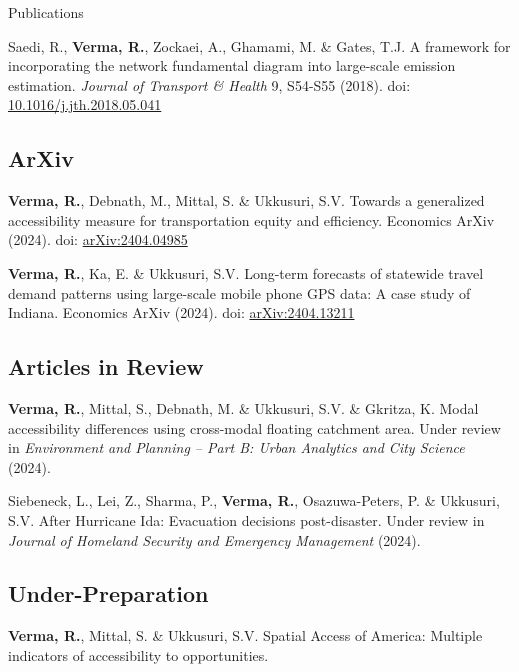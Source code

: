 \documentclass{CV} %
\begin{document}
\begin{rSection}{Publications}
\begin{etaremune}
        \item Saedi, R., \textbf{Verma, R.}, Zockaei, A., Ghamami, M. \& Gates, T.J. A framework for incorporating the network fundamental diagram into large-scale emission estimation. \textit{Journal of Transport \& Health} 9, S54-S55 (2018). doi: \href{https://www.sciencedirect.com/science/article/abs/pii/S2214140518302263}{10.1016/j.jth.2018.05.041}
    \end{etaremune}

    \subsection*{ArXiv}
    \begin{etaremune}
        \item \textbf{Verma, R.}, Debnath, M., Mittal, S. \& Ukkusuri, S.V. Towards a generalized accessibility measure for transportation equity and efficiency. Economics ArXiv (2024). doi: \href{https://arxiv.org/abs/2404.04985}{arXiv:2404.04985}
        
        \item \textbf{Verma, R.}, Ka, E. \& Ukkusuri, S.V. Long-term forecasts of statewide travel demand patterns using large-scale mobile phone GPS data: A case study of Indiana. Economics ArXiv (2024). doi: \href{https://arxiv.org/abs/2404.13211}{arXiv:2404.13211}
    \end{etaremune}
    
    \subsection*{Articles in Review}
    \begin{etaremune}
        \item \textbf{Verma, R.}, Mittal, S., Debnath, M. \& Ukkusuri, S.V. \& Gkritza, K. Modal accessibility differences using cross-modal floating catchment area. Under review in \textit{Environment and Planning – Part B: Urban Analytics and City Science} (2024).
               
        \item Siebeneck, L., Lei, Z., Sharma, P., \textbf{Verma, R.}, Osazuwa-Peters, P. \& Ukkusuri, S.V. After Hurricane Ida: Evacuation decisions post-disaster. Under review in \textit{Journal of Homeland Security and Emergency Management} (2024).
    \end{etaremune}
    
    \subsection*{Under-Preparation}
    \begin{etaremune}
        \item \textbf{Verma, R.}, Mittal, S. \& Ukkusuri, S.V. Spatial Access of America: Multiple indicators of accessibility to opportunities.
        

\end{etaremune}
\end{rSection}
\end{document}
